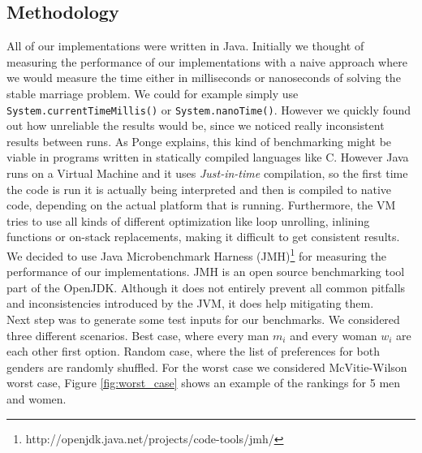 
\subsection{Methodology}

All of our implementations were written in Java. Initially we thought of measuring the performance of our implementations with a naive approach where we would measure the time either in milliseconds or nanoseconds of solving the stable marriage problem. We could for example simply use \texttt{System.currentTimeMillis()} or \texttt{System.nanoTime()}. However we quickly found out how unreliable the results would be, since we noticed really inconsistent results between runs. As Ponge\cite{architectBenchmarking} explains, this kind of benchmarking might be viable in programs written in statically compiled languages like C. However Java runs on a Virtual Machine and it uses \emph{Just-in-time} compilation, so the first time the code is run it is actually being interpreted and then is compiled to native code, depending on the actual platform that is running. Furthermore, the VM tries to use all kinds of different optimization like loop unrolling, inlining functions or on-stack replacements, making it difficult to get consistent results. \\
We decided to use Java Microbenchmark Harness (JMH)\footnote{http://openjdk.java.net/projects/code-tools/jmh/} for measuring the performance of our implementations. JMH is an open source benchmarking tool part of the OpenJDK. Although it does not entirely prevent all common pitfalls and inconsistencies introduced by the JVM, it does help mitigating them. \\
Next step was to generate some test inputs for our benchmarks. We considered three different scenarios. Best case, where every man $m_i$ and every woman $w_i$ are each other first option. Random case, where the list of preferences for both genders are randomly shuffled. For the worst case we considered McVitie-Wilson\cite{mcvitie1971stable} worst case, Figure \ref{fig:worst_case} shows an example of the rankings for 5 men and women.

